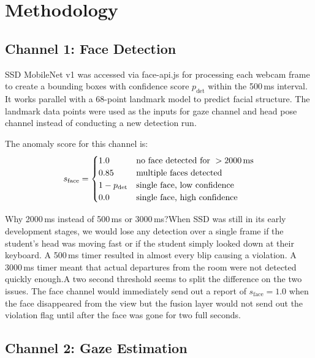 \documentclass[runningheads]{llncs}
\begin{document}
\section{Methodology}\label{sec:method}

\subsection{Channel 1: Face Detection}

SSD MobileNet v1 \cite{liu2016ssd} was accessed via face-api.js \cite{faceapijs} for processing each webcam frame to create a bounding boxes with confidence score $p_{\text{det}}$ within the 500\,ms interval. It works parallel with a 68-point landmark model \cite{kazemi2014} to predict facial structure. The landmark data points were used as the inputs for gaze channel and head pose channel instead of conducting a new detection run.

The anomaly score for this channel is:
\begin{equation}
    s_{\text{face}} = \begin{cases}
        1.0 & \text{no face detected for } > 2000 \text{\,ms} \\
        0.85 & \text{multiple faces detected} \\
        1 - p_{\text{det}} & \text{single face, low confidence} \\
        0.0 & \text{single face, high confidence}
    \end{cases}
\end{equation}

Why 2000\,ms instead of 500\,ms or 3000\,ms?When SSD was still in its early development stages, we would lose any detection over a single frame if the student's head was moving fast or if the student simply looked down at their keyboard. A 500\,ms timer resulted in almost every blip causing a violation.
A 3000\,ms timer meant that actual departures from the room were not detected quickly enough.A two second threshold seems to split the difference on the two issues. The face channel would immediately send out a report of $s_{\text{face}} = 1.0$ when the face disappeared from the view but the fusion layer would not send out the violation flag until after the face was gone for two full seconds.

\subsection{Channel 2: Gaze Estimation}
\end{document}
